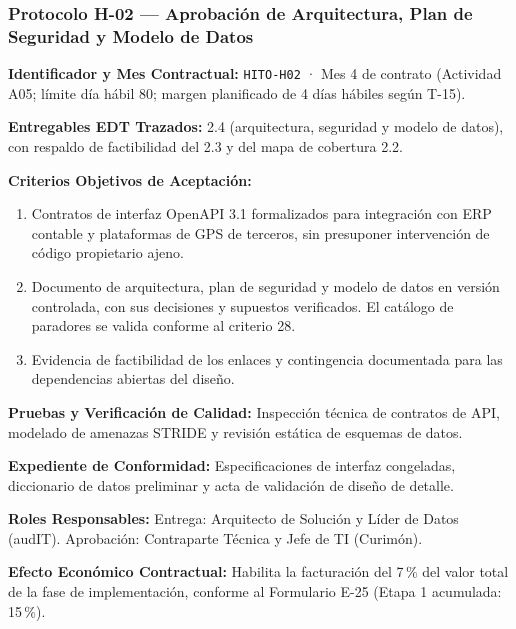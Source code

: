 \subsubsection*{Protocolo H-02 — Aprobación de Arquitectura, Plan de Seguridad y Modelo de Datos}\label{sec:9-proto-h2}
\par\noindent\textbf{Identificador y Mes Contractual:} \texttt{HITO-H02} · Mes 4 de contrato (Actividad A05; límite día hábil 80; margen planificado de 4 días hábiles según T-15).\par
\par\noindent\textbf{Entregables EDT Trazados:} 2.4 (arquitectura, seguridad y modelo de datos), con respaldo de factibilidad del 2.3 y del mapa de cobertura 2.2.\par
\par\noindent\textbf{Criterios Objetivos de Aceptación:}
\begin{enumerate}
  \item Contratos de interfaz OpenAPI 3.1 formalizados para integración con ERP contable y plataformas de GPS de terceros, sin presuponer intervención de código propietario ajeno.
  \item Documento de arquitectura, plan de seguridad y modelo de datos en versión controlada, con sus decisiones y supuestos verificados. El catálogo de paradores se valida conforme al criterio 28.
  \item Evidencia de factibilidad de los enlaces y contingencia documentada para las dependencias abiertas del diseño.
\end{enumerate}
\par\noindent\textbf{Pruebas y Verificación de Calidad:} Inspección técnica de contratos de API, modelado de amenazas STRIDE y revisión estática de esquemas de datos.\par
\par\noindent\textbf{Expediente de Conformidad:} Especificaciones de interfaz congeladas, diccionario de datos preliminar y acta de validación de diseño de detalle.\par
\par\noindent\textbf{Roles Responsables:} Entrega: Arquitecto de Solución y Líder de Datos (audIT). Aprobación: Contraparte Técnica y Jefe de TI (Curimón).\par
\par\noindent\textbf{Efecto Económico Contractual:} Habilita la facturación del 7\,\% del valor total de la fase de implementación, conforme al Formulario E-25 (Etapa 1 acumulada: 15\,\%).\par

